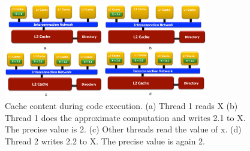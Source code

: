 \begin{figure}[h]
  \centering
  \includegraphics[height = 2.5 in, width=3.5in]{figures/figure4.pdf}
  \caption{Cache content during code execution. (a) Thread 1 reads X (b) Thread 1 does the approximate computation and writes 2.1 to X. The precise value is 2. (c) Other threads read the value of x. (d) Thread 2 writes 2.2 to X. The precise value is again 2.}
  \label{fig:profile}
\end{figure}
